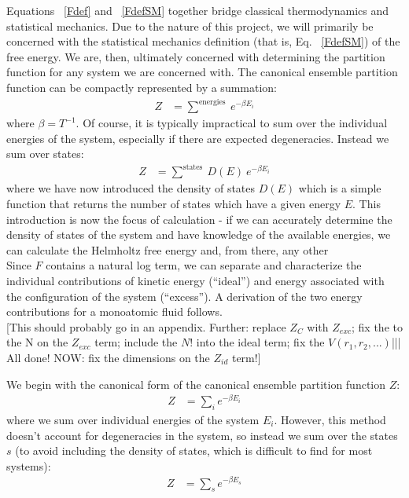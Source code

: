 \documentclass[12pt]{article}
\begin{document}
Equations ~\ref{Fdef} and ~\ref{FdefSM} together bridge classical thermodynamics and statistical mechanics. Due to the nature of this project, we will primarily be concerned with the statistical mechanics definition (that is, Eq. ~\ref{FdefSM}) of the free energy. We are, then, ultimately concerned with determining the partition function for any system we are concerned with. The canonical ensemble partition function can be compactly represented by a summation:
\begin{align}
    Z &= \sum^{\text{energies}}~e^{-\beta E_i}
\end{align}
where $\beta =  T^{-1}$. Of course, it is typically impractical to sum over the individual energies of the system, especially if there are expected degeneracies. Instead we sum over states:
\begin{align}
    Z &= \sum^{\text{states}}~D(E)~e^{-\beta E_i}
\end{align}
where we have now introduced the density of states $D(E)$ which is a simple function that returns the number of states which have a given energy $E$. This introduction is now the focus of calculation - if we can accurately determine the density of states of the system and have knowledge of the available energies, we can calculate the Helmholtz free energy and, from there, any other  \\   
Since $F$ contains a natural log term, we can separate and characterize the individual contributions of kinetic energy (``ideal'') and energy associated with the configuration of the system (``excess'').  
A derivation of the two energy contributions for a monoatomic fluid follows. \\




{\color{red} [This should probably go in an appendix. Further: replace $Z_C$ with $Z_{exc}$; fix the to the N on the $Z_{exc}$ term; include the $N!$ into the ideal term; fix the $V(r_1, r_2, ...)$||| All done! NOW: fix the dimensions on the $Z_{id}$ term!]}

We begin with the canonical form of the canonical ensemble partition function $Z$:
\begin{align}
    Z &= \sum_i e^{-\beta E_i}
\end{align}
where we sum over individual energies of the system $E_i$. However, this method doesn't account for degeneracies in the system, so instead we sum over the states $s$ (to avoid including the density of states, which is difficult to find for most systems):
\begin{align}
    Z &= \sum_s e^{-\beta E_s}
\end{align} 
\end{document}
